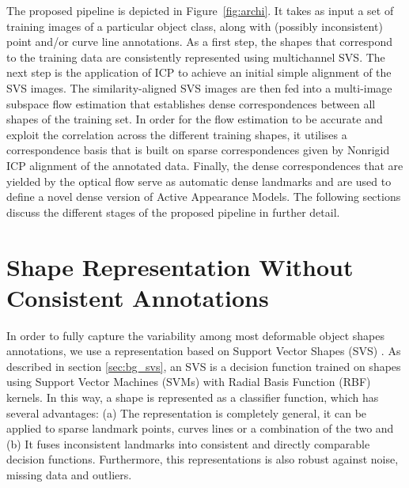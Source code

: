 The proposed pipeline is depicted in Figure~\ref{fig:archi}. It takes as input a set of training images of a particular object class, along with (possibly inconsistent) point and/or curve line annotations. 
As a first step, the shapes that correspond to the training data are consistently represented using multichannel SVS. 
The next step is the application of ICP to achieve an initial simple alignment of the SVS images. 
The similarity-aligned SVS images are then fed into a multi-image subspace flow estimation that establishes dense correspondences between all shapes of the training set. In order for the flow estimation to be accurate and exploit the correlation across the different training shapes, it utilises a correspondence basis that is built on sparse correspondences given by Nonrigid ICP alignment of the annotated data. Finally, the dense correspondences that are yielded by the optical flow serve as automatic dense landmarks and are used to define a novel dense version of Active Appearance Models. The following sections discuss the different stages of the proposed pipeline in further detail.

\section{Shape Representation Without Consistent Annotations}
\label{sec:svs}

In order to fully capture the variability among most deformable object shapes annotations, we use a representation based on Support Vector Shapes (SVS) \cite{Nguyen2013}. As described in section \ref{sec:bg_svs}, an SVS is a decision function trained on shapes using Support Vector Machines (SVMs) with  Radial Basis Function (RBF) kernels. In this way, a shape is represented as a classifier function, which has several advantages: (a) The representation is completely general, \eg it can be applied to sparse landmark points, curves lines or a combination of the two and (b) It fuses inconsistent landmarks into consistent and directly comparable decision functions. Furthermore, this representations is also robust against noise, missing data and outliers.

